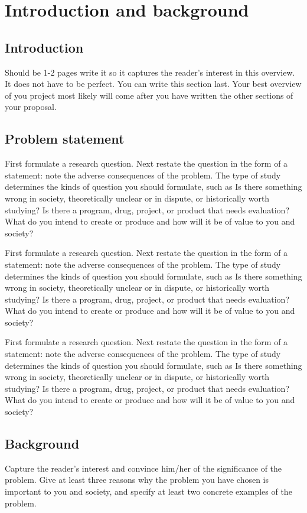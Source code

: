 \chapter{Introduction and background}

\section{Introduction}
Should be 1-2 pages
write it so it captures the reader's interest in this overview. It does not have to be perfect.
You can write this section last. Your best overview of you project most likely will come after you have written the other sections of your proposal.


\section{Problem statement}
First formulate a research question. Next restate the question in the form of a statement: note the adverse consequences of the problem.
The type of study determines the kinds of question you should formulate, such as Is there something wrong in society, theoretically unclear or in dispute, or historically worth studying? Is there a program, drug, project, or product that needs evaluation? What do you intend to create or produce and how will it be of value to you and society?

First formulate a research question. Next restate the question in the form of a statement: note the adverse consequences of the problem.
The type of study determines the kinds of question you should formulate, such as Is there something wrong in society, theoretically unclear or in dispute, or historically worth studying? Is there a program, drug, project, or product that needs evaluation? What do you intend to create or produce and how will it be of value to you and society?

First formulate a research question. Next restate the question in the form of a statement: note the adverse consequences of the problem.
The type of study determines the kinds of question you should formulate, such as Is there something wrong in society, theoretically unclear or in dispute, or historically worth studying? Is there a program, drug, project, or product that needs evaluation? What do you intend to create or produce and how will it be of value to you and society?

\section{Background}
Capture the reader's interest and convince him/her of the significance of the problem.
Give at least three reasons why the problem you have chosen is important to you and society, and specify at least two concrete examples of the problem.

